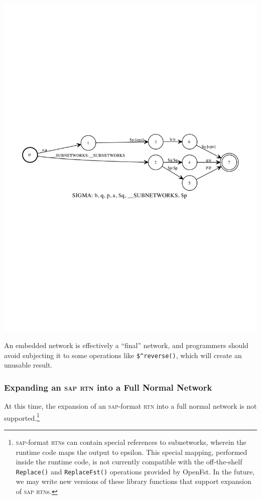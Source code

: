 \documentclass[letterpaper,12pt]{article}
\newcommand{\acro}{\textsc}
\begin{document}
\begin{center}
\includegraphics[width=\textwidth]{images/sapEpsEmbedded.pdf}
\end{center}

An embedded network is effectively a ``final'' network, and
programmers should avoid subjecting it to some operations like
\verb!$^reverse()!, which will create an unusable result.

\subsubsection{Expanding an \acro{sap} \acro{rtn} into a Full Normal Network}

At this time, the expansion of an \acro{sap}-format \acro{rtn} into a full normal network
is not supported.\footnote{\acro{sap}-format \acro{rtn}s can contain special references
to subnetworks, wherein the runtime code maps the output to epsilon.  This special
mapping, performed inside the runtime code, is not currently compatible with the
off-the-shelf \verb!Replace()! and \verb!ReplaceFst()! operations provided by OpenFst.
In the future, we may write new versions of these library functions that support
expansion of \acro{sap} \acro{rtn}s.}
\end{document}
